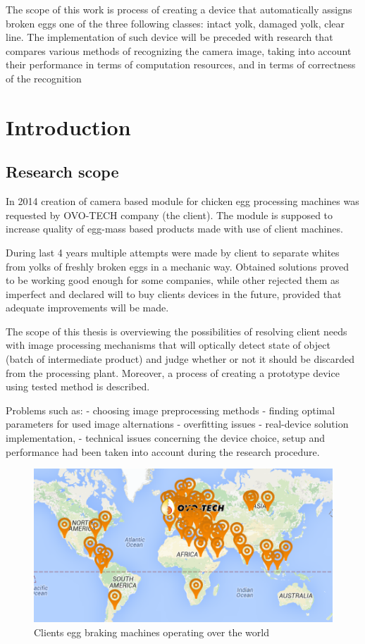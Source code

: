 \documentclass[12pt,twoside,a4paper]{article}
\begin{document}
\tableofcontents

The scope of this work is process of creating a device that automatically assigns broken eggs one of the three following classes: intact yolk, damaged yolk, clear line.
The implementation of such device will be preceded with research that compares various methods of recognizing the camera image, taking into account their performance in terms of computation resources, and in terms of correctness of the recognition

\section{Introduction}
\subsection{Research scope}
In 2014 creation of  camera based  module for chicken egg processing machines was requested by OVO-TECH company (the client).
The module is supposed to increase quality of egg-mass based  products made with use of  client machines.

During last 4 years multiple attempts were made by client to separate whites from yolks of freshly broken eggs in a mechanic way. 
Obtained solutions proved to be working good enough for some companies, while other rejected them as imperfect and declared will to buy clients devices in the future, provided that adequate improvements will be made.

The scope of this thesis is overviewing the possibilities of resolving client needs with image processing mechanisms that will optically detect state of object (batch of  intermediate product) and judge whether or not it should be discarded from the processing plant.
Moreover, a process of creating a prototype device using tested method  is described.

Problems such as:
- choosing image preprocessing methods
- finding optimal  parameters for used image alternations
- overfitting issues
- real-device solution implementation, 
- technical issues concerning the device choice, setup and performance 
had been taken  into account during the research procedure.






\begin{figure}[H]
\centering
\includegraphics[width=0.4\paperwidth]{map}
\caption{Clients egg braking machines operating over the world}
\end{figure}
\end{document}

